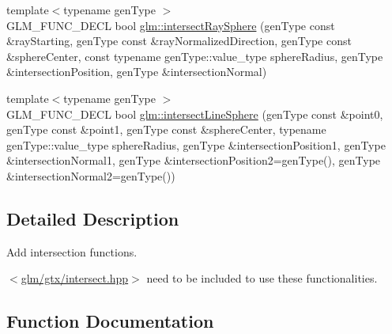 \begin{DoxyCompactItemize}
\item 
{\footnotesize template$<$typename gen\+Type $>$ }\\G\+L\+M\+\_\+\+F\+U\+N\+C\+\_\+\+D\+E\+C\+L bool \hyperlink{group__gtx__intersect_gad28c00515b823b579c608aafa1100c1d}{glm\+::intersect\+Ray\+Sphere} (gen\+Type const \&ray\+Starting, gen\+Type const \&ray\+Normalized\+Direction, gen\+Type const \&sphere\+Center, const typename gen\+Type\+::value\+\_\+type sphere\+Radius, gen\+Type \&intersection\+Position, gen\+Type \&intersection\+Normal)
\item 
{\footnotesize template$<$typename gen\+Type $>$ }\\G\+L\+M\+\_\+\+F\+U\+N\+C\+\_\+\+D\+E\+C\+L bool \hyperlink{group__gtx__intersect_ga9c68139f3d8a4f3d7fe45f9dbc0de5b7}{glm\+::intersect\+Line\+Sphere} (gen\+Type const \&point0, gen\+Type const \&point1, gen\+Type const \&sphere\+Center, typename gen\+Type\+::value\+\_\+type sphere\+Radius, gen\+Type \&intersection\+Position1, gen\+Type \&intersection\+Normal1, gen\+Type \&intersection\+Position2=gen\+Type(), gen\+Type \&intersection\+Normal2=gen\+Type())
\end{DoxyCompactItemize}


\subsection{Detailed Description}
Add intersection functions. 

$<$\hyperlink{intersect_8hpp}{glm/gtx/intersect.\+hpp}$>$ need to be included to use these functionalities. 

\subsection{Function Documentation}
\hypertarget{group__gtx__intersect_ga9c68139f3d8a4f3d7fe45f9dbc0de5b7}{}

